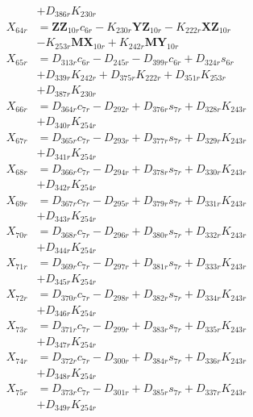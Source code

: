 \begin{multicols}{2}
\begin{align}
&+ D_{386r}K_{230r} \nonumber \\
X_{64r} &= \mathbf{ZZ}_{10r}c_{6r} - K_{230r}\mathbf{YZ}_{10r} - K_{222r}\mathbf{XZ}_{10r}  \nonumber \\
&- K_{253r}\mathbf{MX}_{10r} + K_{242r}\mathbf{MY}_{10r} \nonumber \\
X_{65r} &= D_{313r}c_{6r} - D_{245r} - D_{399r}c_{6r} + D_{324r}s_{6r}  \nonumber \\
&+ D_{339r}K_{242r} + D_{375r}K_{222r} + D_{351r}K_{253r}  \nonumber \\
&+ D_{387r}K_{230r} \nonumber \\
X_{66r} &= D_{364r}c_{7r} - D_{292r} + D_{376r}s_{7r} + D_{328r}K_{243r}  \nonumber \\
&+ D_{340r}K_{254r} \nonumber \\
X_{67r} &= D_{365r}c_{7r} - D_{293r} + D_{377r}s_{7r} + D_{329r}K_{243r}  \nonumber \\
&+ D_{341r}K_{254r} \nonumber \\
X_{68r} &= D_{366r}c_{7r} - D_{294r} + D_{378r}s_{7r} + D_{330r}K_{243r}  \nonumber \\
&+ D_{342r}K_{254r} \nonumber \\
X_{69r} &= D_{367r}c_{7r} - D_{295r} + D_{379r}s_{7r} + D_{331r}K_{243r}  \nonumber \\
&+ D_{343r}K_{254r} \nonumber \\
X_{70r} &= D_{368r}c_{7r} - D_{296r} + D_{380r}s_{7r} + D_{332r}K_{243r}  \nonumber \\
&+ D_{344r}K_{254r} \nonumber \\
X_{71r} &= D_{369r}c_{7r} - D_{297r} + D_{381r}s_{7r} + D_{333r}K_{243r}  \nonumber \\
&+ D_{345r}K_{254r} \nonumber \\
X_{72r} &= D_{370r}c_{7r} - D_{298r} + D_{382r}s_{7r} + D_{334r}K_{243r}  \nonumber \\
&+ D_{346r}K_{254r} \nonumber \\
X_{73r} &= D_{371r}c_{7r} - D_{299r} + D_{383r}s_{7r} + D_{335r}K_{243r}  \nonumber \\
&+ D_{347r}K_{254r} \nonumber \\
X_{74r} &= D_{372r}c_{7r} - D_{300r} + D_{384r}s_{7r} + D_{336r}K_{243r}  \nonumber \\
&+ D_{348r}K_{254r} \nonumber \\
X_{75r} &= D_{373r}c_{7r} - D_{301r} + D_{385r}s_{7r} + D_{337r}K_{243r}  \nonumber \\
&+ D_{349r}K_{254r} \nonumber \\

\end{align}
\end{multicols}
